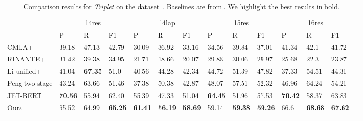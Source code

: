 \documentclass[11pt,a4paper]{article}
\begin{document}
\begin{table*}[!ht]
    \centering\small
    \setlength{\tabcolsep}{0.75pt} \renewcommand{\arraystretch}{1.3}
    \begin{tabular}{m{2.5cm}m{1.065cm}<{\centering}m{1.065cm}<{\centering}m{1.065cm}<{\centering}|m{1.065cm}<{\centering}m{1.065cm}<{\centering}m{1.065cm}<{\centering}|m{1.065cm}<{\centering}m{1.065cm}<{\centering}m{1.065cm}<{\centering}|m{1.065cm}<{\centering}m{1.065cm}<{\centering}m{1.065cm}<{\centering}m{1.065cm}<{\centering}}
      \Xhline{0.08em}
      \multirow{2}{*}{Model} & \multicolumn{3}{c|}{14res} & \multicolumn{3}{c|}{14lap} & \multicolumn{3}{c|}{15res} & \multicolumn{3}{c}{16res}                                                                                            \\
      \cline{2-13}
                             & P                          & R                          & F1                         & P                         & R     & F1             & P     & R     & F1             & P     & R     & F1             \\
      \cline{1-13}
      CMLA+                  & 39.18                      & 47.13                      & 42.79                      & 30.09                     & 36.92 & 33.16          & 34.56 & 39.84 & 37.01          & 41.34 & 42.1  & 41.72          \\
      RINANTE+               & 31.42                      & 39.38                      & 34.95                      & 21.71                     & 18.66 & 20.07          & 29.88 & 30.06 & 29.97          & 25.68 & 22.3  & 23.87          \\
      Li-unified+            & 41.04                      & \textbf{67.35}                      & 51.0                       & 40.56                     & 44.28 & 42.34          & 44.72 & 51.39 & 47.82          & 37.33 & 54.51 & 44.31          \\
      Peng-two-stage         & 43.24                      & 63.66                      & 51.46                      & 37.38                     & 50.38 & 42.87          & 48.07 & 57.51 & 52.32          & 46.96 & 64.24 & 54.21          \\
      JET-BERT               & \textbf{70.56}                      & 55.94                      & 62.40                       & 55.39                     & 47.33 & 51.04          & \textbf{64.45} & 51.96 & 57.53          & \textbf{70.42} & 58.37 & 63.83          \\
      \Xhline{0.05em}
      Ours                   & 65.52                     & 64.99                      & \textbf{65.25}             & \textbf{61.41}                     & \textbf{56.19} & \textbf{58.69} & 59.14 & \textbf{59.38} & \textbf{59.26} & 66.6 & \textbf{68.68}& \textbf{67.62} \\
      \Xhline{0.08em}
    \end{tabular}
    \caption{Comparison results for \emph{Triplet} on the   dataset~\citep{DBLP:conf/emnlp/XuLLB20}. Baselines are from \citep{DBLP:conf/emnlp/XuLLB20}. We highlight the best results in bold.}
    \label{tb:pengb}
  \end{table*}
\end{document}
